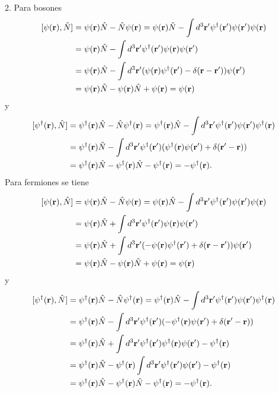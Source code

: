 \documentclass{article}
\begin{document}
2. Para bosones 
\begin{align}
\begin{split}
[\psi(\vb{r}),\hat{N}]&=\psi(\vb{r})\hat{N}-\hat{N}\psi(\vb{r})=\psi(\vb{r})\hat{N}-\int d^3\vb{r}'\psi^\dagger(\vb{r}')\psi(\vb{r}')\psi(\vb{r})\\
&=\psi(\vb{r})\hat{N}-\int d^3\vb{r}'\psi^\dagger(\vb{r}')\psi(\vb{r})\psi(\vb{r}')\\
&=\psi(\vb{r})\hat{N}-\int d^3\vb{r}'(\psi(\vb{r})\psi^\dagger(\vb{r}')-\delta(\vb{r}-\vb{r}'))\psi(\vb{r}')\\
&=\psi(\vb{r})\hat{N}-\psi(\vb{r})\hat{N}+\psi(\vb{r})=\psi(\vb{r})
\end{split}
\end{align}
y
\begin{align}
\begin{split}
[\psi^\dagger(\vb{r}),\hat{N}]&=\psi^\dagger(\vb{r})\hat{N}-\hat{N}\psi^\dagger(\vb{r})=\psi^\dagger(\vb{r})\hat{N}-\int d^3\vb{r}'\psi^\dagger(\vb{r}')\psi(\vb{r}')\psi^\dagger(\vb{r})\\
&=\psi^\dagger(\vb{r})\hat{N}-\int d^3\vb{r}'\psi^\dagger(\vb{r}')(\psi^\dagger(\vb{r})\psi(\vb{r}')+\delta(\vb{r}'-\vb{r}))\\
&=\psi^\dagger(\vb{r})\hat{N}-\psi^\dagger(\vb{r})\hat{N}-\psi^\dagger(\vb{r})=-\psi^\dagger(\vb{r}).
\end{split}
\end{align}
Para fermiones se tiene
\begin{align}
\begin{split}
[\psi(\vb{r}),\hat{N}]&=\psi(\vb{r})\hat{N}-\hat{N}\psi(\vb{r})=\psi(\vb{r})\hat{N}-\int d^3\vb{r}'\psi^\dagger(\vb{r}')\psi(\vb{r}')\psi(\vb{r})\\
&=\psi(\vb{r})\hat{N}+\int d^3\vb{r}'\psi^\dagger(\vb{r}')\psi(\vb{r})\psi(\vb{r}')\\
&=\psi(\vb{r})\hat{N}+\int d^3\vb{r}'(-\psi(\vb{r})\psi^\dagger(\vb{r}')+\delta(\vb{r}-\vb{r}'))\psi(\vb{r}')\\
&=\psi(\vb{r})\hat{N}-\psi(\vb{r})\hat{N}+\psi(\vb{r})=\psi(\vb{r})
\end{split}
\end{align}
y
\begin{align}
\begin{split}
[\psi^\dagger(\vb{r}),\hat{N}]&=\psi^\dagger(\vb{r})\hat{N}-\hat{N}\psi^\dagger(\vb{r})=\psi^\dagger(\vb{r})\hat{N}-\int d^3\vb{r}'\psi^\dagger(\vb{r}')\psi(\vb{r}')\psi^\dagger(\vb{r})\\
&=\psi^\dagger(\vb{r})\hat{N}-\int d^3\vb{r}'\psi^\dagger(\vb{r}')(-\psi^\dagger(\vb{r})\psi(\vb{r}')+\delta(\vb{r}'-\vb{r}))\\
&=\psi^\dagger(\vb{r})\hat{N}+\int d^3\vb{r}'\psi^\dagger(\vb{r}')\psi^\dagger(\vb{r})\psi(\vb{r}')-\psi^\dagger(\vb{r})\\
&=\psi^\dagger(\vb{r})\hat{N}- \psi^\dagger(\vb{r})\int d^3\vb{r}'\psi^\dagger(\vb{r'})\psi(\vb{r}')-\psi^\dagger(\vb{r})\\
&=\psi^\dagger(\vb{r})\hat{N}-\psi^\dagger(\vb{r})\hat{N}-\psi^\dagger(\vb{r})=-\psi^\dagger(\vb{r}).
\end{split}
\end{align}
\end{document}

